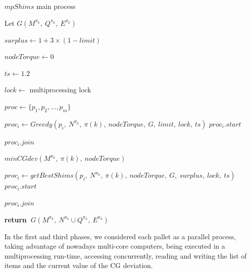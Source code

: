 \documentclass[preprint,authoryear]{elsarticle}
\renewcommand{\Return}{\State \bf {return}~}
\begin{document}
\begin{algorithm}[H]
	\caption{$mpShims$ main process}  \label{alg:mpShims}
	
	\begin{algorithmic}[1]
		
		
		\State Let $G(M^{\pi_k},\ Q^{\pi_k},\ E^{\pi_k})$ \label{mpShims:g1} 
		
		\State $surplus \gets 1 + 3 \times (1 - limit)$
		
		\State $nodeTorque \gets 0$
		
		\State $ts \gets 1.2$  \label{mpShims:ts}
		
		\State $lock \gets$ multiprocessing lock  \label{mpShims:lock} 
		
		\State $proc \gets \{p_1,p_2,..., p_m\}$  
		
		\State $proc_i \gets Greedy(p_i,\ N^{\pi_k},\ \pi(k),\ nodeTorque,\ G,\ limit,\ lock,\ ts )$   \label{mpShims:greedy}
		\State $proc_i.start$
		\EndFor
		
		\State $proc_i.join$ \label{mpShims:join1}
		\EndFor
		
		\State $minCGdev(M^{\pi_k},\ \pi(k),\ nodeTorque)$  \label{mpShims:minCGdev} 
		
		\State $proc_i \gets getBestShims(p_i,\ N^{\pi_k},\ \pi(k),\ nodeTorque,\ G,\ surplus,\ lock,\ ts )$ \label{mpShims:getBestShims}
		\State $proc_i.start$
		\EndFor
		
		\State $proc_i.join$ \label{mpShims:join2}

		\EndFor
		
		\Return $G(M^{\pi_k},\ N^{\pi_k} \cup Q^{\pi_k},\ E^{\pi_k})$ \label{mpShims:return}
		
		\EndProcedure
		
	\end{algorithmic}
\end{algorithm}

In the first and third phases, we considered each pallet as a parallel process, taking advantage of nowadays multi-core computers, being executed in a multiprocessing run-time, accessing concurrently, reading and writing the list of items and the current value of the CG deviation.
\end{document}
